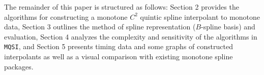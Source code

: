 The remainder of this paper is structured as follows: Section 2
provides the algorithms for constructing a monotone $C^2$ quintic
spline interpolant to monotone data, Section 3 outlines the method of
spline representation ($B$-spline basis) and evaluation, Section 4
analyzes the complexity and sensitivity of the algorithms in {\tt
  MQSI}, and Section 5 presents timing data and some graphs of
constructed interpolants as well as a visual comparison with
  existing monotone spline packages.

